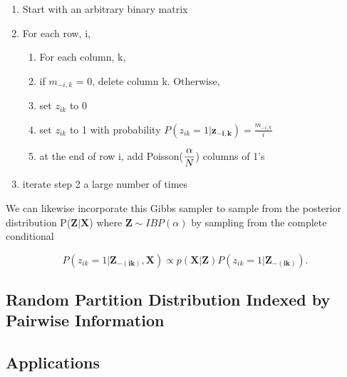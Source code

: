 \begin{enumerate}
  \item Start with an arbitrary binary matrix
  \item For each row, i,
  \begin{enumerate}
    \item For each column, k,
    \item if $m_{-i,k}$ = 0, delete column k. Otherwise,
    \item set $z_{ik}$ to 0
    \item set $z_{ik}$ to 1 with probability $P(z_{ik}=1|\bm{z_{-i,k}}) = \frac{m_{-i,k}}{i}$
    \item at the end of row i, add Poisson($\displaystyle\frac{\alpha}{N}$) columns of 1's
  \end{enumerate}
  \item iterate step 2 a large number of times
\end{enumerate}
We can likewise incorporate this Gibbs sampler to sample from the posterior distribution P($\bm{Z|X}$)
where $\bm Z \sim IBP(\alpha)$ by sampling from the complete conditional

\begin{equation}
  P(z_{ik}=1|\bm{Z_{-(ik)},X})  \propto p(\bm{X|Z}) P(z_{ik}=1|\bm{Z_{-(ik)}}).
\end{equation}


\subsection{Random Partition Distribution Indexed by Pairwise Information}




\subsection{Applications}


